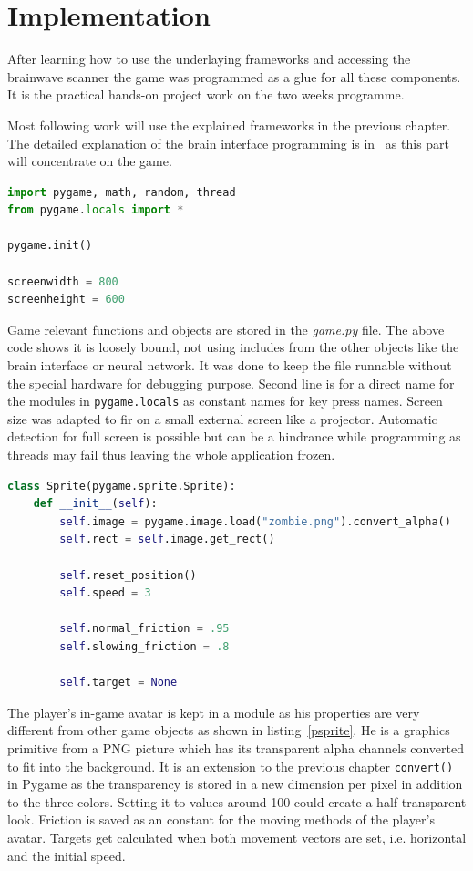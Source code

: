 \documentclass[bibtotocnumbered, headsepline,normalheadings,12pt]{report}
\begin{document}
\chapter{Implementation}
\label{chap:impl}

After learning how to use the underlaying frameworks and accessing the brainwave scanner the game was programmed as a glue for all these 
components. It is the practical hands-on project work on the two weeks programme.

Most following work will use the explained frameworks in the previous chapter. The detailed explanation of the brain interface programming is 
in~\cite{pm} as this part will concentrate on the game. 


\begin{lstlisting}[language=Python,caption=Initialisation]
import pygame, math, random, thread
from pygame.locals import *

pygame.init()

screenwidth = 800
screenheight = 600
\end{lstlisting}

Game relevant functions and objects are stored in the \textit{game.py} file. The above code shows it is loosely bound, not using 
includes from the other objects like the brain interface or neural network. It was done to keep the file runnable without the special
hardware for debugging purpose. Second line is for a direct name for the modules in \texttt{pygame.locals} as constant names for key press names.
Screen size was adapted to fir on a small external screen like a projector. Automatic detection for full screen is possible but can be 
a hindrance while programming as threads may fail thus leaving the whole application frozen.


\begin{lstlisting}[float,language=Python,caption=Player Sprite Module, label=psprite]
class Sprite(pygame.sprite.Sprite):
    def __init__(self):
        self.image = pygame.image.load("zombie.png").convert_alpha()
        self.rect = self.image.get_rect()

        self.reset_position()
        self.speed = 3 

        self.normal_friction = .95 
        self.slowing_friction = .8

        self.target = None 
\end{lstlisting}

The player's in-game avatar is kept in a module as his properties are very different from other game objects as shown in listing~\ref{psprite}. He is a graphics primitive from a 
PNG picture which has its transparent alpha channels converted to fit into the background. It is an extension to the previous chapter \texttt{convert()} 
in Pygame as the transparency is stored in a new dimension per pixel in addition to the three colors. Setting it to values around 100 could create a 
half-transparent look.
Friction is saved as an constant for the moving methods of the player's avatar. Targets get calculated when both movement vectors are set, i.e. horizontal
and the initial speed.
\end{document}

